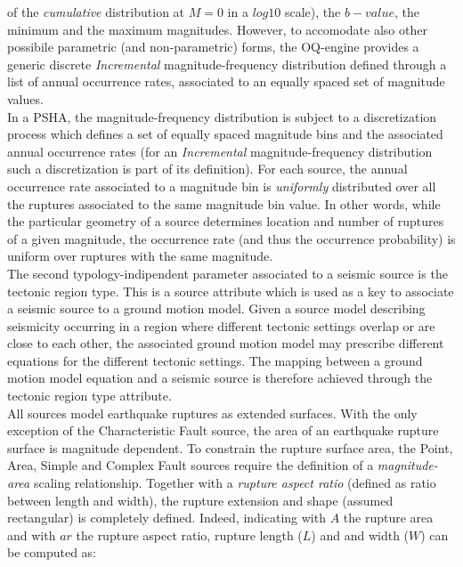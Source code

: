 of the \textit{cumulative} distribution at $M=0$ in a $log10$ scale), the $b-value$, the minimum and
the maximum magnitudes. However, to accomodate also other possibile parametric (and non-parametric)
forms, the OQ-engine provides a generic discrete \textit{Incremental} magnitude-frequency distribution
defined through a list of annual occurrence rates, associated to an equally spaced set of magnitude values.\\
In a PSHA, the magnitude-frequency distribution is subject to a discretization process which defines a set
of equally spaced magnitude bins and the associated annual occurrence rates (for an \textit{Incremental}
magnitude-frequency distribution such a discretization is part of its definition). For each source, the annual
occurrence rate associated to a magnitude bin is \textit{uniformly} distributed over all the ruptures associated
to the same magnitude bin value. In other words, while the particular geometry of a source determines
location and number of ruptures of a given magnitude, the occurrence rate (and thus the occurrence
probability) is uniform over ruptures with the same magnitude.\\
The second typology-indipendent parameter associated to a seismic source is the tectonic region type.
This is a source attribute which is used as a key to associate a seismic source to a ground motion model.
Given a source model describing seismicity occurring in a region where different tectonic settings overlap or
are close to each other, the associated ground motion model may prescribe different equations for the different
tectonic settings. The mapping between a ground motion model equation and a seismic source is therefore
achieved through the tectonic region type attribute.\\
All sources model earthquake ruptures as extended surfaces. With the only exception of the Characteristic Fault source, the area of an earthquake rupture surface is magnitude dependent. To constrain the rupture surface area, the Point, Area, Simple and Complex Fault sources require the definition of a \textit{magnitude-area} scaling relationship. Together with a \textit{rupture aspect ratio} (defined as ratio between length and width), the rupture extension and shape (assumed rectangular) is completely defined. Indeed, indicating with $A$ the rupture area and with $ar$ the rupture aspect ratio, rupture length ($L$) and and width ($W$) can be computed as:
